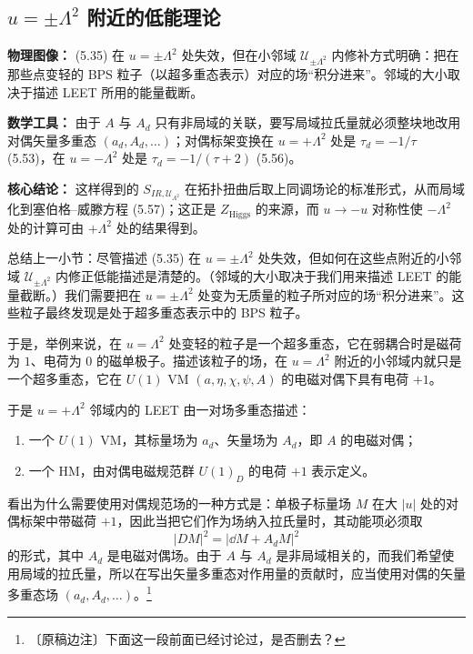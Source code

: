 \subsection{$u=\pm\Lambda^{2}$ 附近的低能理论}

\begin{keytakeaways}
\item \textbf{物理图像：} (5.35) 在 $u=\pm\Lambda^{2}$ 处失效，但在小邻域 $\mathcal{U}_{\pm\Lambda^{2}}$ 内修补方式明确：把在那些点变轻的 BPS 粒子（以超多重态表示）对应的场“积分进来”。邻域的大小取决于描述 LEET 所用的能量截断。
\item \textbf{数学工具：} 由于 $A$ 与 $A_{d}$ 只有非局域的关联，要写局域拉氏量就必须整块地改用对偶矢量多重态 $(a_{d},A_{d},\dots)$；对偶标架变换在 $u=+\Lambda^{2}$ 处是 $\tau_{d}=-1/\tau$ (5.53)，在 $u=-\Lambda^{2}$ 处是 $\tau_{d}=-1/(\tau+2)$ (5.56)。
\item \textbf{核心结论：} 这样得到的 $S_{IR,\mathcal{U}_{\Lambda^{2}}}$ 在拓扑扭曲后取上同调场论的标准形式，从而局域化到塞伯格--威滕方程 (5.57)；这正是 $Z_{\text{Higgs}}$ 的来源，而 $u\to-u$ 对称性使 $-\Lambda^{2}$ 处的计算可由 $+\Lambda^{2}$ 处的结果得到。
\end{keytakeaways}

总结上一小节：尽管描述 (5.35) 在 $u=\pm\Lambda^{2}$ 处失效，但如何在这些点附近的小邻域 $\mathcal{U}_{\pm\Lambda^{2}}$ 内修正低能描述是清楚的。（邻域的大小取决于我们用来描述 LEET 的能量截断。）我们需要把在 $u=\pm\Lambda^{2}$ 处变为无质量的粒子所对应的场“积分进来”。这些粒子最终发现是处于超多重态表示中的 BPS 粒子。

于是，举例来说，在 $u=\Lambda^{2}$ 处变轻的粒子是一个超多重态，它在弱耦合时是磁荷为 $1$、电荷为 $0$ 的磁单极子。描述该粒子的场，在 $u=\Lambda^{2}$ 附近的小邻域内就只是一个超多重态，它在 $U(1)$ VM $(a,\eta,\chi,\psi,A)$ 的电磁对偶下具有电荷 $+1$。

于是 $u=+\Lambda^{2}$ 邻域内的 LEET 由一对场多重态描述：
\begin{enumerate}[label=\arabic*., leftmargin=2.1em]
\item 一个 $U(1)$ VM，其标量场为 $a_{d}$、矢量场为 $A_{d}$，即 $A$ 的电磁对偶；
\item 一个 HM，由对偶电磁规范群 $U(1)_{D}$ 的电荷 $+1$ 表示定义。
\end{enumerate}

看出为什么需要使用对偶规范场的一种方式是：单极子标量场 $M$ 在大 $|u|$ 处的对偶标架中带磁荷 $+1$，因此当把它们作为场纳入拉氏量时，其动能项必须取
\begin{equation}
|DM|^{2}=|\dd M+A_{d}M|^{2}
\tag{5.54}
\end{equation}
的形式，其中 $A_{d}$ 是电磁对偶场。由于 $A$ 与 $A_{d}$ 是非局域相关的，而我们希望使用局域的拉氏量，所以在写出矢量多重态对作用量的贡献时，应当使用对偶的矢量多重态场 $(a_{d},A_{d},\dots)$。\footnote{〔原稿边注〕下面这一段前面已经讨论过，是否删去？}

